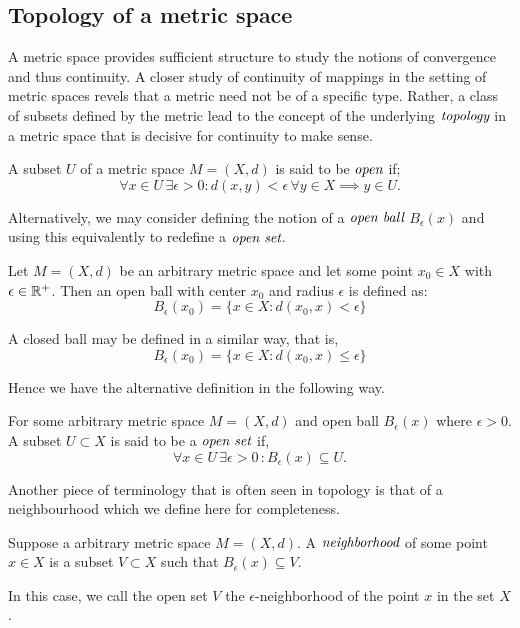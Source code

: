 \subsection{Topology of a metric space}

A metric space provides sufficient structure to study the notions of
convergence and thus continuity. A closer study of continuity of mappings
in the setting of metric spaces revels that a metric need not be of a
specific type. Rather, a class of subsets defined by the metric lead to
the concept of the underlying $\emph{topology}$ in a metric space that is
decisive for continuity to make sense.

\begin{defn}
	A subset $U$ of a metric space $M=(X,d)$ is said to be $\emph{open}$ if;
	\[
		\forall x \in U \, \exists \epsilon > 0 : d(x,y)
		< \epsilon \, \forall y \in X \implies y \in U.
	\]
\end{defn}

Alternatively, we may consider defining the notion of a
$\emph{open ball}$ $B_{\epsilon}(x)$ and using this
equivalently to redefine a $\emph{open set}$.

\begin{defn}
	Let $M=(X,d)$ be an arbitrary metric space and let some point
	$x_0 \in X$ with $\epsilon \in \mathbb{R}^{+}$. Then an open ball
	with center $x_0$ and radius $\epsilon$ is defined as:
	\[
		B_{\epsilon}(x_0) = \{ x \in X : d(x_0,x) < \epsilon \}
	\]
\end{defn}

\begin{rem}
	A closed ball may be defined in a similar way, that is,
	\[
		B_{\epsilon}(x_0) = \{ x \in X : d(x_0,x) \leq \epsilon \}
	\]
\end{rem}

Hence we have the alternative definition in the following way.

\begin{defn}
	For some arbitrary metric space $M=(X,d)$ and open ball $B_{\epsilon}(x)$
	where $\epsilon>0$. A subset $U \subset X$ is said to be a $\emph{open set}$ if,
	\[
		\forall x \in U \, \exists \epsilon >0 \, : B_{\epsilon}(x) \subseteq U.
	\]
\end{defn}

Another piece of terminology that is often seen in topology is
that of a neighbourhood which we define here for completeness.

\begin{defn}[Neighbourhood]
	Suppose a arbitrary metric space $M=(X,d)$. A $\emph{neighborhood}$
	of some point $x \in X$ is a subset $V \subset X$ such that
	$B_{\epsilon}(x) \subseteq V$.

	In this case, we call the open set $V$ the $\epsilon$-neighborhood
	of the point $x$ in the set $X$.
\end{defn}

